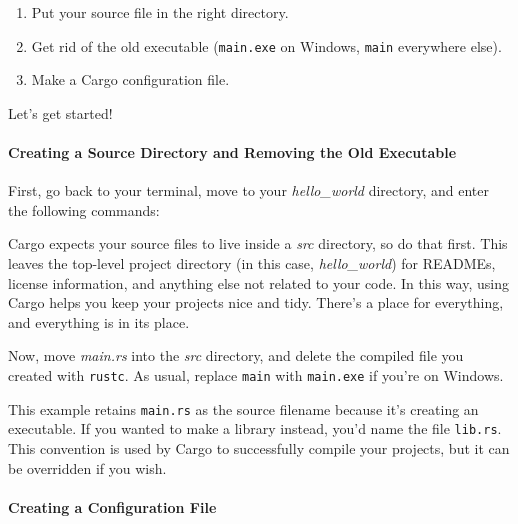 \documentclass[a4paper,]{book}
\newenvironment{Shaded}{\begin{snugshade}}{\end{snugshade}}
\newcommand{\KeywordTok}[1]{\textcolor[rgb]{0.13,0.29,0.53}{\textbf{{#1}}}}
\newcommand{\CommentTok}[1]{\textcolor[rgb]{0.56,0.35,0.01}{\textit{{#1}}}}
\newcommand{\NormalTok}[1]{{#1}}
\providecommand{\tightlist}{%
  \setlength{\itemsep}{0pt}\setlength{\parskip}{0pt}}
\let\oldparagraph\paragraph
\renewcommand{\paragraph}[1]{\oldparagraph{#1}\mbox{}}
\begin{document}
\begin{enumerate}
\def\labelenumi{\arabic{enumi}.}
\tightlist
\item
  Put your source file in the right directory.
\item
  Get rid of the old executable (\texttt{main.exe} on Windows,
  \texttt{main} everywhere else).
\item
  Make a Cargo configuration file.
\end{enumerate}

Let's get started!

\paragraph{Creating a Source Directory and Removing the Old
Executable}\label{creating-a-source-directory-and-removing-the-old-executable}

First, go back to your terminal, move to your \emph{hello\_world}
directory, and enter the following commands:

\begin{Shaded}
\end{Shaded}

Cargo expects your source files to live inside a \emph{src} directory,
so do that first. This leaves the top-level project directory (in this
case, \emph{hello\_world}) for READMEs, license information, and
anything else not related to your code. In this way, using Cargo helps
you keep your projects nice and tidy. There's a place for everything,
and everything is in its place.

Now, move \emph{main.rs} into the \emph{src} directory, and delete the
compiled file you created with \texttt{rustc}. As usual, replace
\texttt{main} with \texttt{main.exe} if you're on Windows.

This example retains \texttt{main.rs} as the source filename because
it's creating an executable. If you wanted to make a library instead,
you'd name the file \texttt{lib.rs}. This convention is used by Cargo to
successfully compile your projects, but it can be overridden if you
wish.

\paragraph{Creating a Configuration
File}\label{creating-a-configuration-file}
\end{document}
